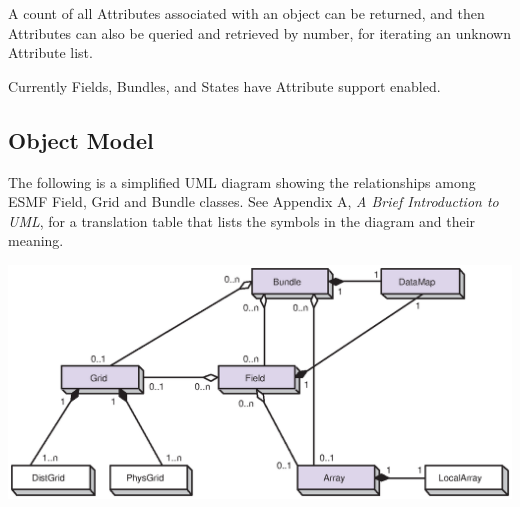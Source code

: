 A count of all Attributes associated with an object can be returned, and
then Attributes can also be queried and retrieved by number, for iterating
an unknown Attribute list.

Currently Fields, Bundles, and States have Attribute support enabled.

\newpage
\subsection{Object Model}

The following is a simplified UML diagram showing the relationships among
ESMF Field, Grid and Bundle classes.  See Appendix A, {\it A Brief 
Introduction to UML},
for a translation table that lists the symbols in the diagram and their 
meaning.

\begin{center}
\includegraphics{Bundle_obj.eps}   
\end{center}









